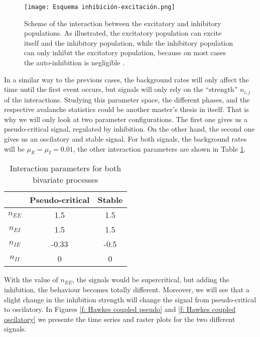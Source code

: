 \begin{figure}[H]
\centering
\texttt{[image: Esquema inhibición-excitación.png]}
\caption{Scheme of the interaction between the excitatory and inhibitory populations. As illustrated, the excitatory population can excite itself and the inhibitory population, while the
inhibitory population can only inhibit the excitatory population, because on most cases the auto-inhibition is negligible \cite{kalle2018growing}.}
\label{f: Hawkes coupled}
\end{figure}

In a similar way to the previous cases, the background rates will only affect the time until the first event occurs, but signals will only rely on the ``strength'' $n_{i,j}$ of the interactions.
Studying this parameter space, the different phases, and the respective avalanche statistics could be another master's thesis in itself. That is why we will only look at two parameter 
configurations. The first one gives us a pseudo-critical signal, regulated by inhibition. On the other hand, the second one gives us an oscilatory and stable signal. For both signals, 
the background rates will be $\mu_E=\mu_I=0.01$, the other interaction parameters are shown in Table \ref{tab: Hawkes coupled parameters}.


\begin{table}[H]
    \centering
    \caption{Interaction parameters for both bivariate processes}
    \label{tab: Hawkes coupled parameters}
    \begin{tabular}{@{}ccc@{}}
    \toprule
     & \multicolumn{1}{c}{Pseudo-critical} & \multicolumn{1}{c}{Stable} \\ \midrule
    $n_{EE}$ & 1.5 & 1.5 \\
    $n_{EI}$ & 1.5 & 1.5 \\
    $n_{IE}$ & -0.33 & -0.5 \\
    $n_{II}$ & 0 & 0 \\ \bottomrule
    \end{tabular}
\end{table}

With the value of $n_{EE}$, the signals would be supercritical, but adding the inhibition, the behaviour becomes totally different. Moreover, we will see that a 
slight change in the inhibition strength will change the signal from pseudo-critical to oscilatory. In Figures \ref{f: Hawkes coupled pseudo} and \ref{f: Hawkes coupled oscilatory}
we presente the time series and raster plots for the two different signals.


